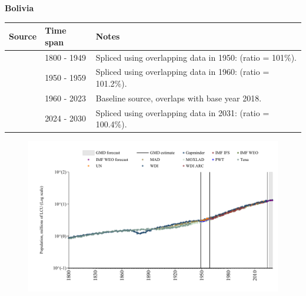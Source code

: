 \documentclass[12pt,a4paper,landscape]{article}
\begin{document}
\begin{adjustbox}{max totalsize={\paperwidth}{\paperheight},center}
\begin{minipage}[t][\textheight][t]{\textwidth}
\vspace*{0.5cm}
{}
\begin{center}
{\Large\bfseries Bolivia}
\end{center}
\vspace{0.5cm}
\begin{table}[H]
\centering
\small
\begin{tabular}{|l|l|l|}
\hline
\textbf{Source} & \textbf{Time span} & \textbf{Notes} \\
\hline
\rowcolor{white}\cite{Gapminder}& 1800 - 1949 &Spliced using overlapping data in 1950: (ratio = 101\%).\\
\rowcolor{lightgray}\cite{IMF_IFS}& 1950 - 1959 &Spliced using overlapping data in 1960: (ratio = 101.2\%).\\
\rowcolor{white}\cite{WDI}& 1960 - 2023 &Baseline source, overlaps with base year 2018.\\
\rowcolor{lightgray}\cite{Gapminder}& 2024 - 2030 &Spliced using overlapping data in 2031: (ratio = 100.4\%).\\
\hline
\end{tabular}
\end{table}
\begin{figure}[H]
\centering
\includegraphics[width=\textwidth,height=0.6\textheight,keepaspectratio]{graphs/BOL_pop.pdf}
\end{figure}
\end{minipage}
\end{adjustbox}
\end{document}
